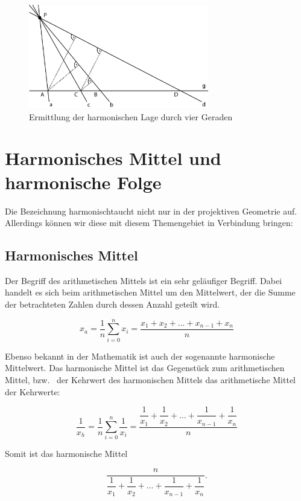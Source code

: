 \documentclass[12pt,a4paper]{article}
\begin{document}
\begin{figure}[htbp] 
\centering
\includegraphics[width=0.7\textwidth]{Bilder/vierGeraden.png}
\caption{Ermittlung der harmonischen Lage durch vier Geraden}
\label{fig:vierGeraden}
\end{figure}

\newpage
\section{Harmonisches Mittel und harmonische Folge}
\label{sec:harmMittel}

Die Bezeichnung \glqq harmonisch\grqq taucht nicht nur in der projektiven Geometrie auf. Allerdings können wir diese mit diesem Themengebiet in Verbindung bringen:

\subsection{Harmonisches Mittel}

Der Begriff des arithmetischen Mittels ist ein sehr geläufiger Begriff. Dabei handelt es sich beim arithmetischen Mittel um den Mittelwert, der die Summe der betrachteten Zahlen durch dessen Anzahl geteilt wird.

\[x_a = \dfrac{1}{n} \sum_{i=0}^n x_i = \dfrac{x_1 + x_2 + \dots + x_{n-1} + x_n}{n}\]

Ebenso bekannt in der Mathematik ist auch der sogenannte harmonische Mittelwert. Das harmonische Mittel ist das Gegenstück zum arithmetischen Mittel, bzw.~ der Kehrwert des harmonischen Mittels das arithmetische Mittel der Kehrwerte:

\[ \dfrac{1}{x_h} = \dfrac{1}{n} \sum_{i=0}^n \dfrac{1}{x_i} = \dfrac{\dfrac{1}{x_1} + \dfrac{1}{x_2} + \dots + \dfrac{1}{x_{n-1}} + \dfrac{1}{x_n}}{n}\]

Somit ist das harmonische Mittel

\[ \dfrac{n}{\dfrac{1}{x_1} + \dfrac{1}{x_2} + \dots + \dfrac{1}{x_{n-1}} + \dfrac{1}{x_n}}.\]
\end{document}
